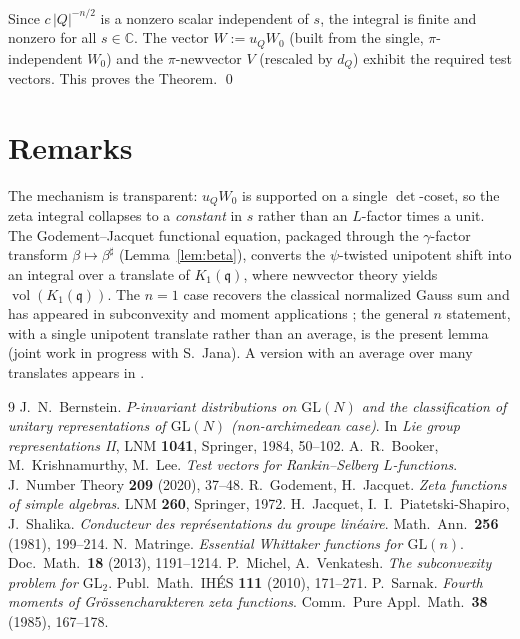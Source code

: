\documentclass[11pt]{article}
\newcommand{\qq}{\mathfrak{q}}
\newcommand{\C}{\mathbb{C}}
\newcommand{\GL}{\mathrm{GL}}
\newcommand{\vol}{\operatorname{vol}}
\begin{document}
Since $c\,|Q|^{-n/2}$ is a nonzero scalar independent of $s$, the integral is
finite and nonzero for all $s\in\C$. The vector $W:=u_Q W_0$ (built from the
single, $\pi$-independent $W_0$) and the $\pi$-newvector $V$ (rescaled by $d_Q$)
exhibit the required test vectors. This proves the Theorem. \qed

\section*{Remarks}

The mechanism is transparent: $u_Q W_0$ is supported on a single $\det$-coset, so
the zeta integral collapses to a \emph{constant} in $s$ rather than an
$L$-factor times a unit. The Godement--Jacquet functional equation, packaged
through the $\gamma$-factor transform $\beta\mapsto\beta^\sharp$
(Lemma~\ref{lem:beta}), converts the $\psi$-twisted unipotent shift into an
integral over a translate of $K_1(\qq)$, where newvector theory yields
$\vol(K_1(\qq))$. The $n=1$ case recovers the classical normalized Gauss sum and
has appeared in subconvexity and moment applications \cite{Sarnak,MV}; the
general $n$ statement, with a single unipotent translate rather than an average,
is the present lemma (joint work in progress with S.~Jana). A version with an
average over many translates appears in \cite{BKL}.

\begin{thebibliography}{9}
 J.~N.~Bernstein.
  \emph{$P$-invariant distributions on $\GL(N)$ and the classification of
  unitary representations of $\GL(N)$ (non-archimedean case)}. In
  \emph{Lie group representations II}, LNM \textbf{1041}, Springer, 1984,
  50--102.
 A.~R.~Booker, M.~Krishnamurthy, M.~Lee.
  \emph{Test vectors for Rankin--Selberg $L$-functions}.
  J.\ Number Theory \textbf{209} (2020), 37--48.
 R.~Godement, H.~Jacquet.
  \emph{Zeta functions of simple algebras}. LNM \textbf{260}, Springer, 1972.
 H.~Jacquet, I.~I.~Piatetski-Shapiro, J.~Shalika.
  \emph{Conducteur des repr\'esentations du groupe lin\'eaire}.
  Math.\ Ann.\ \textbf{256} (1981), 199--214.
 N.~Matringe.
  \emph{Essential Whittaker functions for $\GL(n)$}.
  Doc.\ Math.\ \textbf{18} (2013), 1191--1214.
 P.~Michel, A.~Venkatesh.
  \emph{The subconvexity problem for $\GL_2$}.
  Publ.\ Math.\ IH\'ES \textbf{111} (2010), 171--271.
 P.~Sarnak.
  \emph{Fourth moments of Gr\"ossencharakteren zeta functions}.
  Comm.\ Pure Appl.\ Math.\ \textbf{38} (1985), 167--178.
\end{thebibliography}
\end{document}
